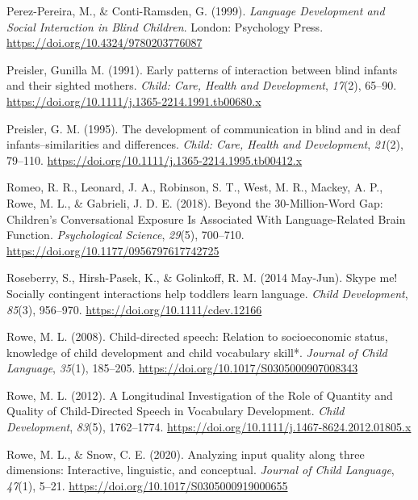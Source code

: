 \documentclass[
  man]{apa6}
\newlength{\cslhangindent}
\newlength{\cslentryspacingunit} %
\newenvironment{CSLReferences}[2] %
 {%
  \setlength{\parindent}{0pt}
  \ifodd #1
  \let\oldpar\par
  \def\par{\hangindent=\cslhangindent\oldpar}
  \fi
  \setlength{\parskip}{#2\cslentryspacingunit}
 }%
 {}
\begin{document}
\begin{CSLReferences}{1}{0}
\leavevmode{}%
Perez-Pereira, M., \& Conti-Ramsden, G. (1999). \emph{Language {Development} and {Social Interaction} in {Blind Children}}. {London}: {Psychology Press}. \url{https://doi.org/10.4324/9780203776087}

\leavevmode{}%
Preisler, Gunilla M. (1991). Early patterns of interaction between blind infants and their sighted mothers. \emph{Child: Care, Health and Development}, \emph{17}(2), 65--90. \url{https://doi.org/10.1111/j.1365-2214.1991.tb00680.x}

\leavevmode{}%
Preisler, G. M. (1995). The development of communication in blind and in deaf infants--similarities and differences. \emph{Child: Care, Health and Development}, \emph{21}(2), 79--110. \url{https://doi.org/10.1111/j.1365-2214.1995.tb00412.x}

\leavevmode{}%
Romeo, R. R., Leonard, J. A., Robinson, S. T., West, M. R., Mackey, A. P., Rowe, M. L., \& Gabrieli, J. D. E. (2018). Beyond the 30-{Million-Word Gap}: {Children}'s {Conversational Exposure Is Associated With Language-Related Brain Function}. \emph{Psychological Science}, \emph{29}(5), 700--710. \url{https://doi.org/10.1177/0956797617742725}

\leavevmode{}%
Roseberry, S., Hirsh-Pasek, K., \& Golinkoff, R. M. (2014 May-Jun). Skype me! {Socially} contingent interactions help toddlers learn language. \emph{Child Development}, \emph{85}(3), 956--970. \url{https://doi.org/10.1111/cdev.12166}

\leavevmode{}%
Rowe, M. L. (2008). Child-directed speech: Relation to socioeconomic status, knowledge of child development and child vocabulary skill*. \emph{Journal of Child Language}, \emph{35}(1), 185--205. \url{https://doi.org/10.1017/S0305000907008343}

\leavevmode{}%
Rowe, M. L. (2012). A {Longitudinal Investigation} of the {Role} of {Quantity} and {Quality} of {Child-Directed Speech} in {Vocabulary Development}. \emph{Child Development}, \emph{83}(5), 1762--1774. \url{https://doi.org/10.1111/j.1467-8624.2012.01805.x}

\leavevmode{}%
Rowe, M. L., \& Snow, C. E. (2020). Analyzing input quality along three dimensions: Interactive, linguistic, and conceptual. \emph{Journal of Child Language}, \emph{47}(1), 5--21. \url{https://doi.org/10.1017/S0305000919000655}


\end{CSLReferences}
\end{document}
